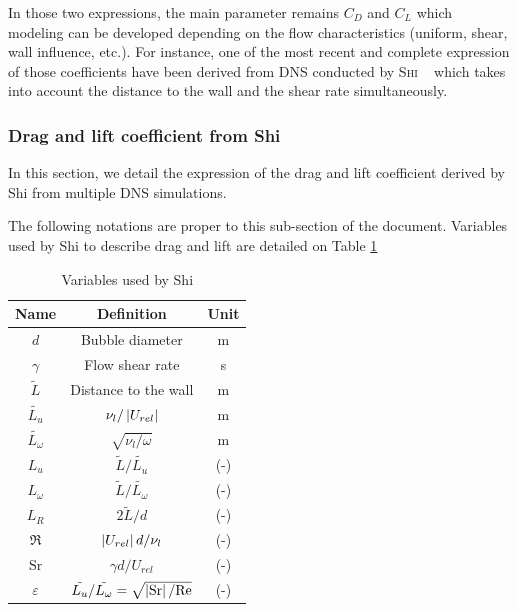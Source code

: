 In those two expressions, the main parameter remains $C_{D}$ and $C_{L}$ which modeling can be developed depending on the flow characteristics (uniform, shear, wall influence, etc.). For instance, one of the most recent and complete expression of those coefficients have been derived from DNS conducted by \textsc{Shi} \etal~ which takes into account the distance to the wall and the shear rate simultaneously.



\subsubsection{Drag and lift coefficient from Shi \etal}

In this section, we detail the expression of the drag and lift coefficient derived by Shi \etal from multiple DNS simulations.

\npar

The following notations are proper to this sub-section of the document. Variables used by Shi \etal to describe drag and lift are detailed on Table \ref{tab:var_shi}

\begin{table}[h!]
\centering
\begin{tabular}{|c|c|c|}
\hline
Name & Definition & Unit\\
\hline
\hline

$d$ & Bubble diameter & m\\
\hline
$\gamma$ & Flow shear rate & s\up{-1}\\
\hline
$\tilde{L}$& Distance to the wall & m\\
\hline
$\tilde{L_{u}}$ & $\nu_{l}/\left| U_{rel} \right|$ & m\\ 
\hline
$\tilde{L_{\omega}}$ & $\sqrt{\nu_{l}/\omega}$ & m\\
\hline
\hline
$L_{u}$ & $\tilde{L}/\tilde{L_{u}}$ & (-)\\
\hline
$L_{\omega}$ & $\tilde{L}/\tilde{L_{\omega}}$ & (-)\\
\hline
$L_{R}$ & $2\tilde{L}/d$ & (-)\\
\hline
$\Re$ & $\left| U_{rel} \right|d/\nu_{l}$ & (-)\\
\hline
$\mathrm{Sr}$ & $\gamma d / U_{rel}$ & (-)\\
\hline
$\varepsilon$ & $\tilde{L_{u}}/\tilde{L_{\omega}}=\sqrt{\left| \mathrm{Sr} \right|/\mathrm{Re}}$ & (-)\\
\hline
\end{tabular}
\caption{Variables used by Shi \etal}
\label{tab:var_shi}
\end{table}


